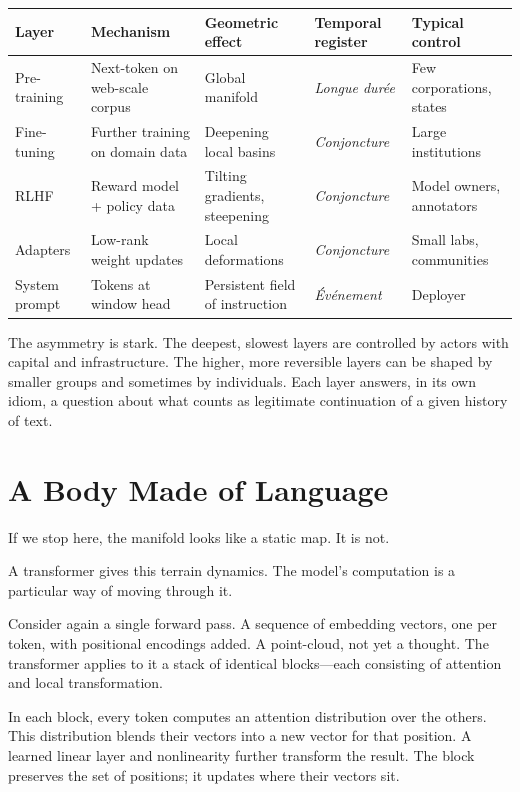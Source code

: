\documentclass[12pt,a4paper]{article}
\begin{document}
\begin{formalbox}[title={Layers of fabrication}]
\begin{tabular}{@{}lllll@{}}
\toprule
\textbf{Layer} & \textbf{Mechanism} & \textbf{Geometric effect} & \textbf{Temporal register} & \textbf{Typical control} \\
\midrule
Pre-training   & Next-token on web-scale corpus & Global manifold                & \emph{Longue dur\'{e}e} & Few corporations, states \\
Fine-tuning    & Further training on domain data& Deepening local basins         & \emph{Conjoncture}      & Large institutions        \\
RLHF           & Reward model + policy data     & Tilting gradients, steepening  & \emph{Conjoncture}      & Model owners, annotators  \\
Adapters       & Low-rank weight updates        & Local deformations             & \emph{Conjoncture}      & Small labs, communities   \\
System prompt  & Tokens at window head          & Persistent field of instruction& \emph{\'{E}v\'{e}nement} & Deployer                  \\
\bottomrule
\end{tabular}
\end{formalbox}

The asymmetry is stark. The deepest, slowest layers are controlled by actors with capital and infrastructure. The higher, more reversible layers can be shaped by smaller groups and sometimes by individuals. Each layer answers, in its own idiom, a question about what counts as legitimate continuation of a given history of text.

\section{A Body Made of Language}

If we stop here, the manifold looks like a static map. It is not.

A transformer gives this terrain dynamics. The model's computation is a particular way of moving through it.

Consider again a single forward pass. A sequence of embedding vectors, one per token, with positional encodings added. A point-cloud, not yet a thought. The transformer applies to it a stack of identical blocks---each consisting of attention and local transformation.

In each block, every token computes an attention distribution over the others. This distribution blends their vectors into a new vector for that position. A learned linear layer and nonlinearity further transform the result. The block preserves the set of positions; it updates where their vectors sit.
\end{document}
